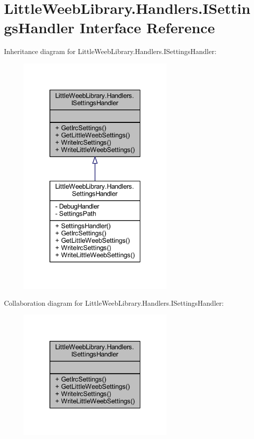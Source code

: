 \hypertarget{interface_little_weeb_library_1_1_handlers_1_1_i_settings_handler}{}\section{Little\+Weeb\+Library.\+Handlers.\+I\+Settings\+Handler Interface Reference}
\label{interface_little_weeb_library_1_1_handlers_1_1_i_settings_handler}


Inheritance diagram for Little\+Weeb\+Library.\+Handlers.\+I\+Settings\+Handler\+:\nopagebreak
\begin{figure}[H]
\begin{center}
\leavevmode
\includegraphics[width=217pt]{interface_little_weeb_library_1_1_handlers_1_1_i_settings_handler__inherit__graph}
\end{center}
\end{figure}


Collaboration diagram for Little\+Weeb\+Library.\+Handlers.\+I\+Settings\+Handler\+:\nopagebreak
\begin{figure}[H]
\begin{center}
\leavevmode
\includegraphics[width=217pt]{interface_little_weeb_library_1_1_handlers_1_1_i_settings_handler__coll__graph}
\end{center}
\end{figure}
